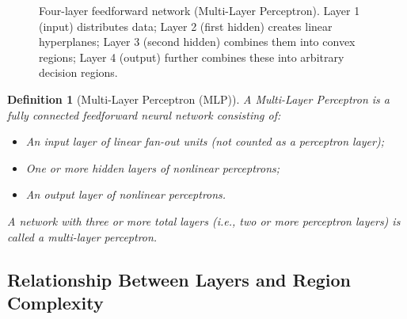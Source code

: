\documentclass[12pt,a4paper]{article}
\newtheorem{definition}{Definition}[section]
\begin{document}
\begin{figure}[ht]
\caption{Four-layer feedforward network (Multi-Layer Perceptron).
  Layer 1 (input) distributes data; Layer 2 (first hidden) creates linear
  hyperplanes; Layer 3 (second hidden) combines them into convex regions;
  Layer 4 (output) further combines these into arbitrary decision regions.}
\label{fig:mlp}
\end{figure}

\begin{definition}[Multi-Layer Perceptron (MLP)]
\label{def:mlp}
A \emph{Multi-Layer Perceptron} is a fully connected feedforward neural
network consisting of:
\begin{itemize}[noitemsep]
  \item An \emph{input layer} of linear fan-out units (not counted as a
        perceptron layer);
  \item One or more \emph{hidden layers} of nonlinear perceptrons;
  \item An \emph{output layer} of nonlinear perceptrons.
\end{itemize}
A network with three or more total layers (i.e., two or more perceptron
layers) is called a multi-layer perceptron.
\end{definition}

\subsection{Relationship Between Layers and Region Complexity}
\label{subsec:layers-regions}
\end{document}
